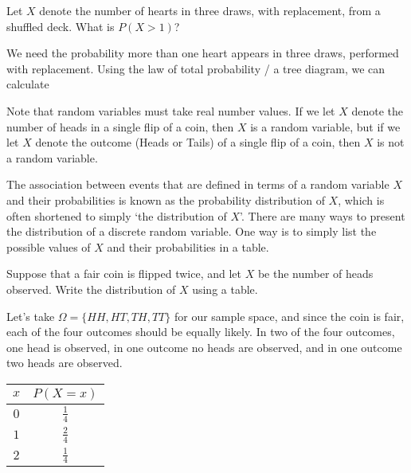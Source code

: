 \begin{examp} Let $X$ denote the number of hearts in three draws, with replacement, from a shuffled deck. What is $P(X > 1)$?
\par
\noindent We need the probability more than one heart appears in three draws, performed with replacement. Using the law of total probability / a tree diagram, we can calculate
\end{examp}
\par

\begin{rmk} Note that random variables must take real number values. If we let $X$ denote the number of heads in a single flip of a coin, then $X$ is a random variable, but if we let $X$ denote the outcome (Heads or Tails) of a single flip of a coin, then $X$ is not a random variable.
\end{rmk}

The association between events that are defined in terms of a random variable $X$ and their probabilities is known as the probability distribution of $X$, which is often shortened to simply `the distribution of $X$'. There are many ways to present the distribution of a discrete random variable. One way is to simply list the possible values of $X$ and their probabilities in a table.

\begin{examp} Suppose that a fair coin is flipped twice, and let $X$ be the number of heads observed. Write the distribution of $X$ using a table.
\par
\noindent
Let's take $\Omega = \{HH, HT, TH, TT\}$ for our sample space, and since the coin is fair, each of the four outcomes should be equally likely. In two of the four outcomes, one head is observed, in one outcome no heads are observed, and in one outcome two heads are observed.
\renewcommand*{\arraystretch}{1.35}
\begin{center}
\begin{tabular}{c|c}
$x$ & $P(X = x)$ \\
\hline
$0$ & $\frac{1}{4}$ \\
$1$ & $\frac{2}{4}$ \\
$2$ & $\frac{1}{4}$ \\
\end{tabular}
\end{center}
\renewcommand*{\arraystretch}{1}
\end{examp}

